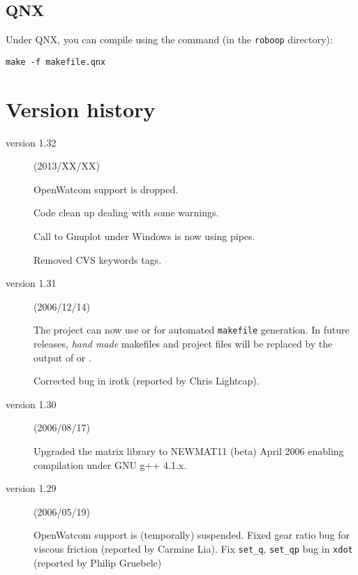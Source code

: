 \documentclass[11pt,fleqn,letterpaper]{report}
\begin{document}
\subsection{QNX}

Under \textsf{QNX}, you can compile using the command (in the
\texttt{roboop} directory):
\begin{verbatim}
make -f makefile.qnx
\end{verbatim}



\section{Version history}

\begin{description}

\item[version 1.32] (2013/XX/XX)

  \textsf{OpenWatcom} support is dropped.

  Code clean up dealing with some warnings.

  Call to \textsf{Gnuplot} under \textsf{Windows} is now using pipes.

  Removed \textsf{CVS} keywords tags.

\item[version 1.31] (2006/12/14)
  
  The project can now use
   or
  for automated \texttt{makefile} generation. In future releases,
  \emph{hand made} makefiles and project files will be replaced by the
  output of 
  or
  .

  Corrected bug in irotk (reported by Chris Lightcap).
  
\item[version 1.30] (2006/08/17)
  
  Upgraded the matrix library to \textsf{NEWMAT11 (beta) April 2006}
  enabling compilation under \textsf{GNU g++ 4.1.x}.
  
\item[version 1.29] (2006/05/19)
  
  \textsf{OpenWatcom} support is (temporally) suspended. Fixed gear
  ratio bug for viscous friction (reported by Carmine Lia). Fix
  \texttt{set\_q}, \texttt{set\_qp} bug in \texttt{xdot} (reported by
  Philip Gruebele)


\end{description}
\end{document}
